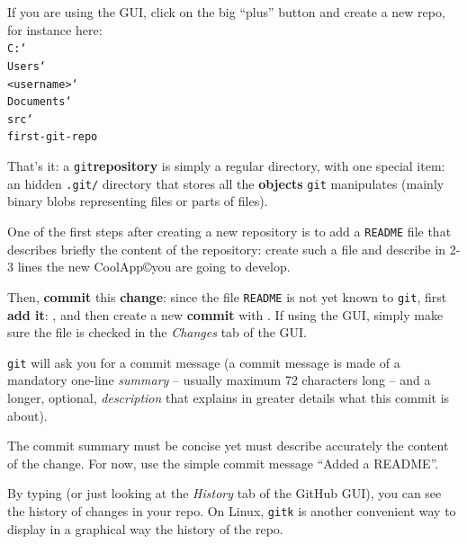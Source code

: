 \documentclass{instructions}
\newcommand{\git}{\texttt{git}\xspace}
\newcommand\bs{\char`\\}
\begin{document}
If you are using the GUI, click on the big ``plus'' button and create a new repo,
for instance here:\\
\texttt{C:\bs{}Users\bs{}<username>\bs{}Documents\bs{}src\bs{}first-git-repo}

That's it: a \git \textbf{repository} is simply a regular directory, with one
special item: an hidden \texttt{.git/} directory that stores all the
\textbf{objects} \git manipulates (mainly binary blobs representing files or
parts of files).


One of the first steps after creating a new repository is to add a
\texttt{README} file that describes briefly the content of the repository:
create such a file and describe in 2-3 lines the new CoolApp\copyright you are going to
develop.


Then, \textbf{commit} this \textbf{change}: since the file \texttt{README} is
not yet known to \git, first \textbf{add it}: , and
then create a new \textbf{commit} with . If using the GUI, simply
make sure the file is checked in the \emph{Changes} tab of the GUI.

\git will ask you for a
commit message (a commit message is made of a mandatory one-line \emph{summary} --
usually maximum 72 characters long -- and a longer, optional, \emph{description} that explains
in greater details what this commit is about).

The commit summary must be concise yet must describe accurately the content of
the change. For now, use the simple commit message ``Added a README''.


By typing  (or just looking at the \emph{History} tab of the GitHub GUI), you can see the
history of changes in your repo. On Linux, \texttt{gitk} is another
convenient way to display in a graphical way the history of the repo.
\end{document}
